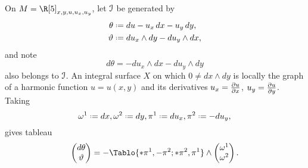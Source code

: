 \begin{example}
On \(M=\R[5]_{x,y,u,u_x,u_y}\), let \(\mathcal{I}\) be generated by 
\begin{align*}
\theta & \defeq du-u_x \, dx - u_y \, dy, \\
\vartheta &\defeq du_x \wedge dy - du_y \wedge dx,
\end{align*}
and note
\[
d\theta = -du_x \wedge dx -du_y \wedge dy
\]
also belongs to \(\mathcal{I}\).
An integral surface \(X\) on which \(0 \ne dx \wedge dy\) is locally the graph of a harmonic function \(u=u(x,y)\) and its derivatives \(u_x = \pderiv{u}{x}\), \(u_y = \pderiv{u}{y}\).
Taking 
\[
\omega^1\defeq dx, \omega^2\defeq dy, \pi^1\defeq du_x, \pi^2\defeq -du_y,
\]
gives tableau
\[
\begin{pmatrix}
d\theta\\
\vartheta
\end{pmatrix}
=-\Tablo{*\pi^1,-\pi^2;*\pi^2,\pi^1}
\wedge
\begin{pmatrix}
\omega^1\\
\omega^2
\end{pmatrix}.
\]
\end{example}


